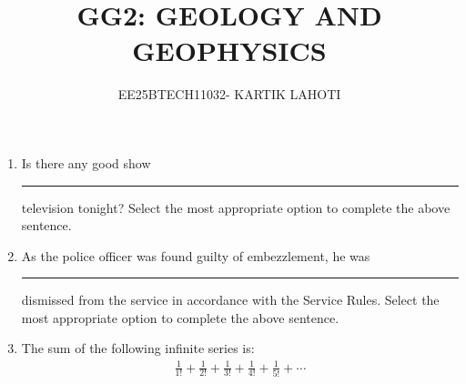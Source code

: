 \documentclass[journal,12pt,onecolumn]{IEEEtran}
\title{GG2: GEOLOGY AND GEOPHYSICS}
\author{EE25BTECH11032- KARTIK LAHOTI}
\theoremstyle{remark}
\begin{document}
\maketitle

\begin{enumerate}

\item Is there any good show \rule{3cm}{0.15mm} television tonight?
Select the most appropriate option to complete the above sentence. \hfill{}
\begin{enumerate}
\end{enumerate}

\item As the police officer was found guilty of embezzlement, he was \rule{3cm}{0.15mm} dismissed from the service in accordance with the Service Rules.
Select the most appropriate option to complete the above sentence. \hfill{}
\begin{enumerate}
\end{enumerate}

\item The sum of the following infinite series is:
\begin{align*}
\frac{1}{1!} + \frac{1}{2!} + \frac{1}{3!} + \frac{1}{4!} + \frac{1}{5!} + \cdots
\end{align*}
\hfill{}
\begin{enumerate}
\end{enumerate}


\end{enumerate}
\end{document}
